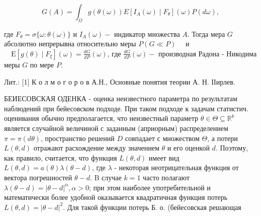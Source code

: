 \documentclass[10pt]{article}
\begin{document}
\[

G(A)=\int_{\Omega} g(\theta(\omega)) E\left[I_{A}(\omega) \mid F_{\theta}\right](\omega) P(d \omega),

\]



где $F_{\theta}=\sigma\{\omega: \theta(\omega)\}$ и $I_{A}(\omega)-$ индикатор множества $A$. Тогда мера $G$ абсолютно непрерывна относительно меры $P(G \ll P) \quad$ и $\quad \mathrm{E}\left[g(\theta) \mid F_{\xi}\right](\omega)=\frac{d G}{d P}(\omega)$, где $\frac{d G}{d P}(\omega)-$ производная Радона - Никодима меры $G$ по мере $P$.



Лит.: [1] К о л м о г о р о в А.Н., Основные понятия теории А. Н. ІІирлев.



БЕИЕСОВСКАЯ ОДЕНКА - оценка неизвестного параметра по результатам наблюдений при бейесовском подходе. При таком подходе к задачам статистич. оценивания обычно предполагается, что неизвестный параметр $\theta \in \Theta \subseteq \mathbb{R}^{k}$ является случайной величиной с заданным (априорным) распределением $\pi=\pi(d \theta)$, пространство решений $D$ совпадает с множеством $\Theta$, а потери $L(\theta, d)$ отражают расхождение между значением $\theta$ и его оценкой $d$. Поэтому, как правило, считается, что функция $L(\theta, d)$ имеет вид $L(\theta, d)=a(\theta) \lambda(\theta-d)$, где $\lambda$ - некоторая неотрицательная функция от вектора погрешностей $\theta-d$. $\mathrm{B}$ случае $k=1$ часто полагают $\lambda(\theta-d)=|\theta-d|^{\alpha}, \alpha>0$; при этом наиболее употребительной и математически более удобной оказывается квадратичная функция потерь $L(\theta, d)=|\theta-d|^{2}$. Для такой функции потерь Б. о. (бейесовская решающая
\end{document}
